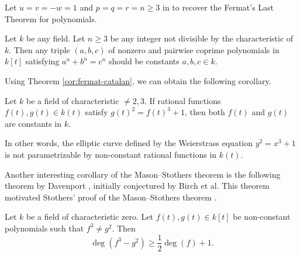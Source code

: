 \documentclass[runningheads]{llncs}
\begin{document}
Let $u = v = -w = 1$ and $p = q = r = n \geq 3$ in  to recover the Fermat's Last Theorem for polynomials.

\begin{corollary}
\label{cor:fermat}
Let $k$ be any field.
Let $n \geq 3$ be any integer not divisible by the characteristic of $k$.
Then any triple $(a, b, c)$ of nonzero and pairwise coprime polynomials in $k[t]$ satisfying $a^n + b^n = c^n$ should be constants $a, b, c \in k$.
\end{corollary}

Using Theorem \ref{cor:fermat-catalan}, we can obtain the following corollary.
\begin{theorem}\label{cor:elliptic}
Let $k$ be a field of characteristic $\neq 2, 3$.
If rational functions $f(t), g(t) \in k(t)$ satisfy $g(t)^2 = f(t)^3 + 1$, then both $f(t)$ and $g(t)$ are constants in $k$.
\end{theorem}

In other words, the elliptic curve defined by the Weierstrass equation $y^2 = x^3 + 1$ is not parametrizable by non-constant rational functions in $k(t)$.

Another interesting corollary of the Mason--Stothers theorem is the following theorem by Davenport \cite{davenport65}, initially conjectured \cite{birch65} by Birch et al.
This theorem motivated Stothers' proof of the Mason--Stothers theorem \cite{stothers81}.

\begin{theorem}[Davenport]\label{cor:davenport}
Let $k$ be a field of characteristic zero. Let $f(t), g(t) \in k[t]$ be non-constant polynomials such that $f^3 \neq g^2$.
Then 
\[
    \deg(f^3 - g^2) \geq \frac{1}{2} \deg(f) + 1.
\]
\end{theorem}

\end{document}
